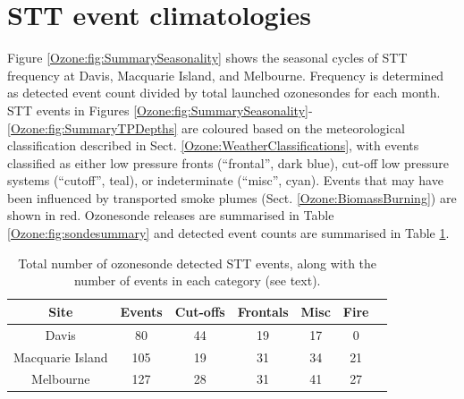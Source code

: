 \section{STT event climatologies}
  \label{Ozone:eventclimatologies}
  Figure \ref{Ozone:fig:SummarySeasonality} shows the seasonal cycles of STT frequency at Davis, Macquarie Island, and Melbourne.
  Frequency is determined as detected event count divided by total launched ozonesondes for each month.
  STT events in Figures \ref{Ozone:fig:SummarySeasonality}-\ref{Ozone:fig:SummaryTPDepths} are coloured based on the meteorological classification described in Sect. \ref{Ozone:WeatherClassifications}, with events classified as either low pressure fronts (“frontal”, dark blue), cut-off low pressure systems (“cutoff”, teal), or indeterminate (“misc”, cyan).
  Events that may have been influenced by transported smoke plumes (Sect. \ref{Ozone:BiomassBurning}) are shown in red.
  Ozonesonde releases are summarised in Table \ref{Ozone:fig:sondesummary} and detected event counts are summarised in Table \ref{Ozone:fig:EventCounts}.
  \begin{table}[t]
    \caption{Total number of ozonesonde detected STT events, along with the number of events in each category (see text).}
    \begin{tabular}{ c   c   c   c   c   c   c } 
      \hline
      Site & Events & Cut-offs & Frontals & Misc & Fire \\
      \hline
      Davis       	& 80 & 44  & 19 & 17 & 0 \\ 
      Macquarie Island 	& 105 & 19 & 31 & 34  & 21 \\
      Melbourne 	& 127 & 28 & 31 & 41 & 27 \\
      \hline
    \end{tabular}
    \label{Ozone:fig:EventCounts}
  \end{table}
  
